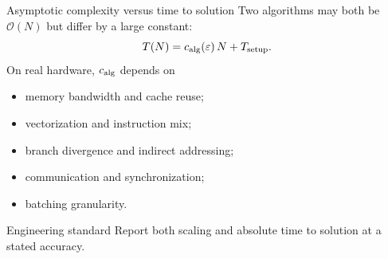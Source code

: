 \documentclass[aspectratio=169,11pt]{beamer}
\newcommand{\cO}{\mathcal{O}}
\newcommand{\eps}{\varepsilon}
\begin{document}
\begin{frame}{Asymptotic complexity versus time to solution}
\small
Two algorithms may both be $\cO(N)$ but differ by a large constant:
\[
T(N)=c_{\rm alg}(\eps)\,N+T_{\rm setup}.
\]
On real hardware, $c_{\rm alg}$ depends on
\begin{itemize}
  \item memory bandwidth and cache reuse;
  \item vectorization and instruction mix;
  \item branch divergence and indirect addressing;
  \item communication and synchronization;
  \item batching granularity.
\end{itemize}

\begin{block}{Engineering standard}
Report both scaling and absolute time to solution at a stated accuracy.
\end{block}
\end{frame}
\end{document}
